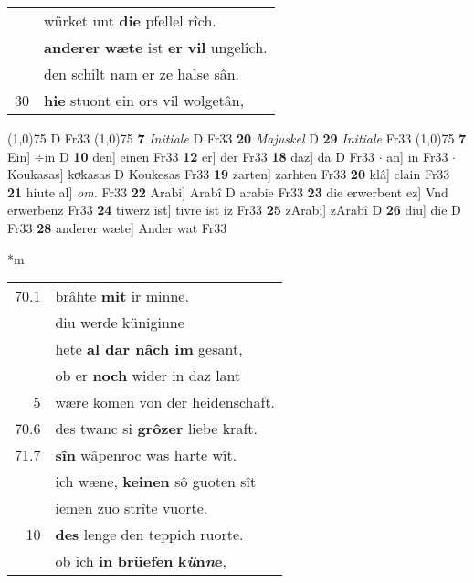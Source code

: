 \documentclass[8pt,a4paper,notitlepage]{article}
\begin{document}
\begin{table}[ht]
\begin{minipage}[t]{0.5\linewidth}
\begin{tabular}{rl}
 & würket unt \textbf{die} pfellel rîch.\\ 
 & \textbf{anderer} \textbf{wæte} ist \textbf{er} \textbf{vil} ungelîch.\\ 
 & den schilt nam er ze halse sân.\\ 
30 & \textbf{hie} stuont ein ors vil wolgetân,\\ 
\end{tabular}
\scriptsize
\line(1,0){75} \newline
D Fr33 \newline
\line(1,0){75} \newline
\textbf{7} \textit{Initiale} D Fr33  \textbf{20} \textit{Majuskel} D  \textbf{29} \textit{Initiale} Fr33  \newline
\line(1,0){75} \newline
\textbf{7} Ein] ÷in D \textbf{10} den] einen Fr33 \textbf{12} er] der Fr33 \textbf{18} daz] da D Fr33  $\cdot$ an] in Fr33  $\cdot$ Koukasas] koͮkasas D Koukesas Fr33 \textbf{19} zarten] zarhten Fr33 \textbf{20} klâ] clain Fr33 \textbf{21} hiute al] \textit{om.} Fr33 \textbf{22} Arabi] Arabî D arabie Fr33 \textbf{23} die erwerbent ez] Vnd erwerbenz Fr33 \textbf{24} tiwerz ist] tivre ist iz Fr33 \textbf{25} zArabi] zArabî D \textbf{26} diu] die D Fr33 \textbf{28} anderer wæte] Ander wat Fr33 \newline
\end{minipage}
\hspace{0.5cm}
\begin{minipage}[t]{0.5\linewidth}
\small
\begin{center}*m
\end{center}
\begin{tabular}{rl}
70.1 & brâhte \textbf{mit} ir minne.\\ 
 & diu werde küniginne\\ 
 & hete \textbf{al dar nâch im} gesant,\\ 
 & ob er \textbf{noch} wider in daz lant\\ 
5 & wære komen von der heidenschaft.\\ 
70.6 & des twanc si \textbf{grôzer} liebe kraft.\\ 
71.7 & \textbf{sîn} wâpenroc was harte wît.\\ 
 & ich wæne, \textbf{keinen} sô guoten sît\\ 
 & iemen zuo strîte vuorte.\\ 
10 & \textbf{des} lenge den teppich ruorte.\\ 
 & ob ich \textbf{in} \textbf{brüefen} \textbf{k\textit{ü}n\textit{n}e},\\ 

\end{tabular}
\end{minipage}
\end{table}
\end{document}
